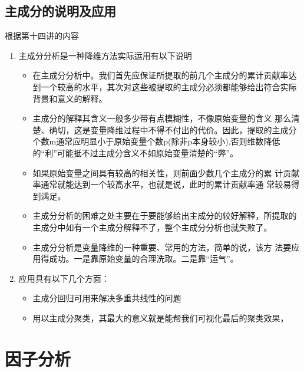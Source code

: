 \documentclass[12pt]{ctexart}
\numberwithin{equation}{section} %
\begin{document}
\subsection{主成分的说明及应用}
根据\cite{清风}第十四讲的内容
\begin{enumerate}
  \item 主成分分析是一种降维方法实际运用有以下说明
\begin{itemize}
  \item 在主成分分析中。我们首先应保证所提取的前几个主成分的累计贡献率达到一个较高的水平，其次对这些被提取的主成分必须都能够给出符合实际背景和意义的解释。
  \item 主成分的解释其含义一般多少带有点模糊性，不像原始变量的含义
  那么清楚、确切，这是变量降维过程中不得不付出的代价。因此，提取的主成分个数m通常应明显小于原始变量个数p(除非p本身较小),否则维数降低的“利”可能抵不过主成分含义不如原始变量清楚的“弊”。
  \item 如果原始变量之间具有较高的相关性，则前面少数几个主成分的累
  计贡献率通常就能达到一个较高水平，也就是说，此时的累计贡献率通
  常较易得到满足。
  \item 主成分分析的困难之处主要在于要能够给出主成分的较好解释，所提取的主成分中如有一个主成分解释不了，整个主成分分析也就失败了。
  \item 主成分分析是变量降维的一种重要、常用的方法，简单的说，该方
  法要应用得成功。一是靠原始变量的合理洗取。二是靠“运气”。
\end{itemize}


\item 应用具有以下几个方面：
\begin{itemize}
  \item 主成分回归可用来解决多重共线性的问题
  \item 用以主成分聚类，其最大的意义就是能帮我们可视化最后的聚类效果，
\end{itemize}
\end{enumerate}

\section{因子分析}
\end{document}
